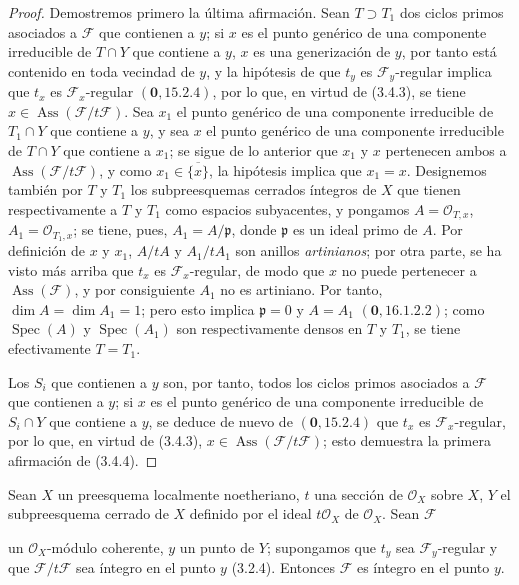 \begin{proof}
Demostremos primero la última afirmación. Sean $T\supset T_1$ dos ciclos
primos asociados a $\mathcal F$ que contienen a $y$; si $x$ es el punto genérico
de una componente irreducible de $T\cap Y$ que contiene a $y$, $x$ es una
generización de $y$, por tanto está contenido en toda vecindad de $y$, y la
hipótesis de que $t_y$ es $\mathcal F_y$-regular implica que $t_x$ es
$\mathcal F_x$-regular $(\mathbf{0},15.2.4)$, por lo que, en virtud de (3.4.3), se tiene
$x\in\operatorname{Ass}(\mathcal F/t\mathcal F)$. Sea $x_1$ el punto
genérico de una componente irreducible de $T_1\cap Y$ que contiene a $y$, y sea
$x$ el punto genérico de una componente irreducible de $T\cap Y$ que contiene a
$x_1$; se sigue de lo anterior que $x_1$ y $x$ pertenecen ambos a
$\operatorname{Ass}(\mathcal F/t\mathcal F)$, y como
$x_1\in\overline{\{x\}}$, la hipótesis implica que $x_1=x$. Designemos también
por $T$ y $T_1$ los subpreesquemas cerrados íntegros de $X$ que tienen
respectivamente a $T$ y $T_1$ como espacios subyacentes, y pongamos
$A=\mathcal O_{T,x}$, $A_1=\mathcal O_{T_1,x}$; se tiene, pues,
$A_1=A/\mathfrak p$, donde $\mathfrak p$ es un ideal primo de $A$. Por
definición de $x$ y $x_1$, $A/tA$ y $A_1/tA_1$ son anillos \emph{artinianos};
por otra parte, se ha visto más arriba que $t_x$ es $\mathcal F_x$-regular, de
modo que $x$ no puede pertenecer a $\operatorname{Ass}(\mathcal F)$, y por
consiguiente $A_1$ no es artiniano. Por tanto, $\dim A=\dim A_1=1$; pero esto
implica $\mathfrak p=0$ y $A=A_1$ $(\mathbf{0},16.1.2.2)$; como
$\operatorname{Spec}(A)$ y $\operatorname{Spec}(A_1)$ son respectivamente
densos en $T$ y $T_1$, se tiene efectivamente $T=T_1$.

Los $S_i$ que contienen a $y$ son, por tanto, todos los ciclos primos asociados
a $\mathcal F$ que contienen a $y$; si $x$ es el punto genérico de una
componente irreducible de $S_i\cap Y$ que contiene a $y$, se deduce de nuevo
de $(\mathbf{0},15.2.4)$ que $t_x$ es $\mathcal F_x$-regular, por lo que, en virtud de
(3.4.3), $x\in\operatorname{Ass}(\mathcal F/t\mathcal F)$; esto demuestra la
primera afirmación de (3.4.4).
\end{proof}

\begin{proposition}[3.4.5]
\label{IV.2.3.4.5-fr}
Sean $X$ un preesquema localmente noetheriano, $t$ una sección de
$\mathcal O_X$ sobre $X$, $Y$ el subpreesquema cerrado de $X$ definido por
el ideal $t\mathcal O_X$ de $\mathcal O_X$. Sean $\mathcal F$


un $\mathcal O_X$-módulo coherente, $y$ un punto de $Y$; supongamos que $t_y$
sea $\mathcal F_y$-regular y que $\mathcal F/t\mathcal F$ sea íntegro en el
punto $y$ \textup{(3.2.4)}. Entonces $\mathcal F$ es íntegro en el punto $y$.
\end{proposition}

